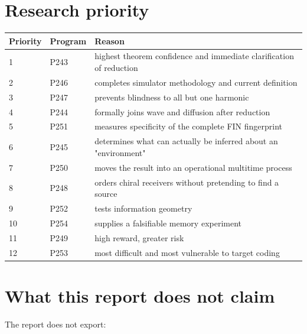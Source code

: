\documentclass[11pt,a4paper,openany]{report}
\begin{document}
\chapter{Research priority}

\begin{center}
\begingroup\small
\setlength{\tabcolsep}{2.5pt}
\renewcommand{\arraystretch}{1.16}
\begin{longtable}{@{}p{}p{}p{}@{}}
\toprule
\textbf{Priority} & \textbf{Program} & \textbf{Reason} \\
\midrule
\endhead
1 & P243 & highest theorem confidence and immediate clarification of reduction \\
2 & P246 & completes simulator methodology and current definition \\
3 & P247 & prevents blindness to all but one harmonic \\
4 & P244 & formally joins wave and diffusion after reduction \\
5 & P251 & measures specificity of the complete FIN fingerprint \\
6 & P245 & determines what can actually be inferred about an "environment" \\
7 & P250 & moves the result into an operational multitime process \\
8 & P248 & orders chiral receivers without pretending to find a source \\
9 & P252 & tests information geometry \\
10 & P254 & supplies a falsifiable memory experiment \\
11 & P249 & high reward, greater risk \\
12 & P253 & most difficult and most vulnerable to target coding \\
\bottomrule
\end{longtable}
\endgroup
\end{center}

\chapter{What this report does not claim}

The report does not export:
\end{document}
